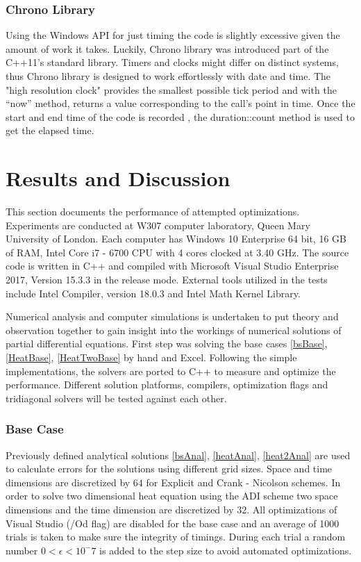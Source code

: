 \documentclass[12pt, oneside]{book}
\theoremstyle{plain}
\theoremstyle{definition}
\begin{document}
\subsection{Chrono Library}
Using the Windows API for just timing the code is slightly excessive given the amount of work it takes. Luckily, Chrono library was introduced part of the C++11’s standard library.  Timers and clocks might differ on distinct systems, thus Chrono library is designed to work effortlessly with date and time. The "high resolution clock" provides the smallest possible tick period and with the “now” method, returns a value corresponding to the call’s point in time.  Once the start and end time of the code is recorded ,  the duration::count method is used to get the elapsed time.


\chapter{Results and Discussion}
This section documents the performance of attempted optimizations. Experiments are  conducted at W307 computer laboratory, Queen Mary University of London. Each computer has Windows 10 Enterprise 64 bit, 16 GB of RAM, Intel Core i7 - 6700 CPU with 4 cores clocked at 3.40 GHz. The source code is written in C++ and compiled with Microsoft Visual Studio Enterprise 2017, Version 15.3.3 in the release mode. External tools  utilized in the tests include Intel Compiler, version 18.0.3 and Intel Math Kernel Library. 

Numerical analysis and computer simulations is undertaken to put theory and observation together to gain insight into the workings of numerical solutions of partial differential equations. First step was solving the base cases \ref{bsBase}, \ref{HeatBase}, \ref{HeatTwoBase} by hand and Excel. Following the simple implementations, the solvers are ported to C++ to measure and optimize the performance. Different solution platforms, compilers, optimization flags and tridiagonal solvers will be tested against each other.
 
\subsection{Base Case}
Previously defined analytical solutions \ref{bsAnal}, \ref{heatAnal}, \ref{heat2Anal} are used to calculate errors for the solutions using different grid sizes. Space and time dimensions are discretized by $64$ for Explicit and Crank - Nicolson schemes. In order to solve two dimensional heat equation using the ADI scheme two space dimensions and the time dimension are discretized by $32$.  All optimizations of Visual Studio  (/Od flag) are disabled for the base case and an average of 1000 trials is taken to make sure the integrity of timings. During each trial a random number $ 0 < \epsilon < 10^-7 $ is added to the step size to avoid automated optimizations.
\end{document}
